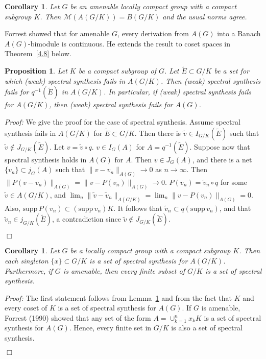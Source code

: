 \documentclass[12 pt]{article}
\newcommand\done{\begin{flushright}$\Box$\end{flushright}}
\newtheorem{prop}[defn]{Proposition}
\newtheorem{cor}[defn]{Corollary}
\begin{document}
\begin{cor}
Let $G$ be an amenable locally compact group with a compact subgroup $K$.  Then
${\mathcal M}(A(G/K)) = B(G/K)$ and the usual norms agree.
\end{cor}


Forrest showed that for amenable $G$, every derivation from $A(G)$ into a Banach
$A(G)$-bimodule is continuous.  He extends the result to coset spaces in Theorem~\ref{4.8}
below.

\begin{prop}\label{4.3'}
Let $K$ be a compact subgroup of $G$.  Let $\tilde{E} \subset G/K$ be a set for which (weak)
spectral synthesis fails in $A(G/K)$.  Then (weak) spectral synthesis fails for $q^{-1}(\tilde{E})$
in $A(G/K)$.  In particular, if (weak) spectral synthesis fails for $A(G/K)$, then (weak)
spectral synthesis fails for $A(G)$.
\end{prop}
{\it Proof:}  We give the proof for the case of spectral synthesis.  Assume spectral synthesis
fails in $A(G/K)$ for $\tilde{E}\subset G/K$.  Then there is $\tilde{v}\in I_{G/K}(\tilde{E})$
such that $\tilde{v}\not\in J_{G/K}(\tilde{E})$.  Let $v=\tilde{v}\circ q$.  $v\in I_G (A)$
for $A=q^{-1}(\tilde{E})$.  Suppose now that spectral synthesis holds in $A(G)$ for $A$.
Then $v\in J_G (A)$, and there is a net $\{v_n\} \subset j_G (A)$ such that
$\|v-v_n\|_{A(G)} \rightarrow 0$ as $n\rightarrow\infty$.  Then
$\|P(v-v_n)\|_{A(G)} = \|v-P(v_n)\|_{A(G)} \rightarrow 0$.  $P(v_n) = \tilde{v}_n \circ q$
for some $\tilde{v}\in A(G/K)$, and $\lim_n \|\tilde{v} - \tilde{v}_{n}\|_{A(G/K)} =
\lim_n \|v-P(v_n)\|_{A(G)} = 0$.  Also, $\text{supp}\,P(v_n) \subset (\text{supp}\,v_n)K$.
It follows that $\tilde{v}_n \subset q(\text{supp}\,v_n)$, and that $\tilde{v}_n \in j_{G/K}(\tilde{E})$,
a contradiction since $\tilde{v} \not\in J_{G/K}(\tilde{E})$.\done


\begin{cor}\label{4.5}
Let $G$ be a locally compact group with a compact subgroup $K$.  Then each singleton $\{x\}
\subset G/K$ is a set of spectral synthesis for $A(G/K)$.  Furthermore, if $G$ is amenable,
then every finite subset of $G/K$ is a set of spectral synthesis.
\end{cor}
{\it Proof:}  The first statement follows from Lemma~\ref{4.3'} and from the fact
that $K$ and every coset of $K$ is a set of spectral synthesis for $A(G)$.
If $G$ is amenable, Forrest (1990) showed that any set of the form
$A=\cup_{k=1}^n x_{k}K$ is a set of spectral synthesis for $A(G)$.  Hence, every finite set
in $G/K$ is also a set of spectral synthesis.\done
\end{document}
